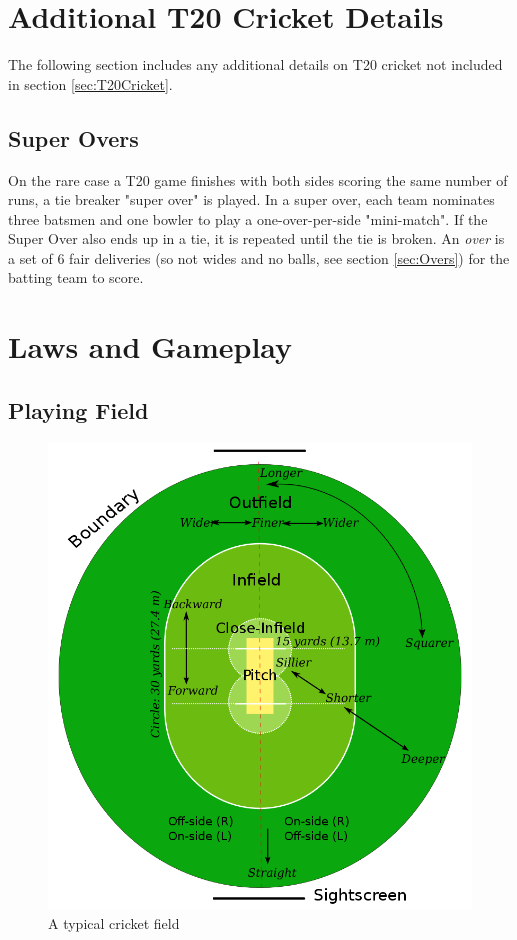 \documentclass[12pt,a4paper]{report}
\theoremstyle{definition}
\begin{document}
\section{Additional T20 Cricket Details} \label{sec:AdditionalT20Cricket}

The following section includes any additional details on T20 cricket not included in section \ref{sec:T20Cricket}.

\subsection{Super Overs}

On the rare case a T20 game finishes with both sides scoring the same number of runs, a tie breaker "super over" is played.
In a super over, each team nominates three batsmen and one bowler to play a one-over-per-side "mini-match".
If the Super Over also ends up in a tie, it is repeated until the tie is broken.
An \emph{over} is a set of 6 fair deliveries (so not wides and no balls, see section \ref{sec:Overs}) for the batting team to score.

\section{Laws and Gameplay}

\subsection{Playing Field}

\begin{figure}[H]
    \centering
    \includegraphics[width=0.8\linewidth]{Cricket_Field.png}
    \caption{A typical cricket field \citep{cricketWiki}}
    \label{fig:CricketField}
\end{figure}
\end{document}
